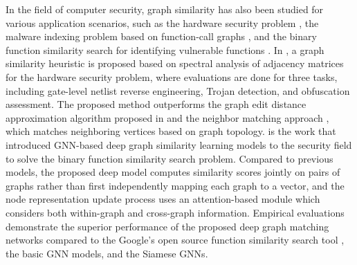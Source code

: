 In the field of computer security, graph similarity has also been studied for various application scenarios, such as the hardware security problem , the malware indexing problem based on function-call graphs , and the binary function similarity search for identifying vulnerable functions . 
In , a graph similarity heuristic is proposed based on spectral analysis of adjacency matrices for the hardware security problem, where evaluations are done for three tasks, including gate-level netlist reverse engineering, Trojan detection, and obfuscation assessment. The proposed method outperforms the graph edit distance approximation algorithm proposed in  and the neighbor matching approach , which matches neighboring vertices based on graph topology.  is the work that introduced GNN-based deep graph similarity learning models to the security field to solve the binary function similarity search problem. Compared to previous models, the proposed deep model computes similarity scores jointly on pairs of graphs rather than first independently mapping each graph to a vector, and the node representation update process uses an attention-based module which considers both within-graph and cross-graph information. Empirical evaluations demonstrate the superior performance of the proposed deep graph matching networks compared to the Google's open source function similarity search tool , the basic GNN models, and the Siamese GNNs.

